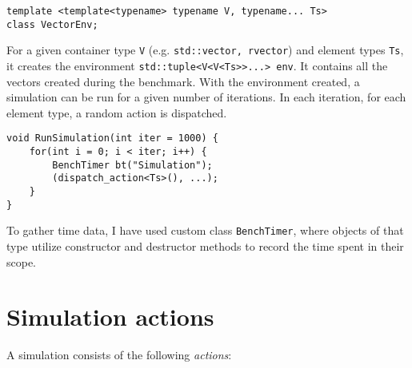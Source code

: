 \documentclass[inz, english, shortabstract]{iithesis}
\begin{document}
\begin{lstlisting}[caption=VectorEnv declaration]
template <template<typename> typename V, typename... Ts>
class VectorEnv;
\end{lstlisting}
For a given container type {\tt V} (e.g. {\tt std::vector, rvector}) and element types {\tt Ts}, it creates 
the environment {\tt std::tuple<V<V<Ts>>...> env}.
It contains all the vectors created during the benchmark.
With the environment created, a simulation can be run for a given number of iterations.
In each iteration, for each element type, a random action is dispatched.

\begin{lstlisting}[caption=RunSimulation]
void RunSimulation(int iter = 1000) {
	for(int i = 0; i < iter; i++) {
		BenchTimer bt("Simulation");
		(dispatch_action<Ts>(), ...);
	}
}
\end{lstlisting}

To gather time data, I have used custom class {\tt BenchTimer}, where objects of that type utilize constructor and destructor methods to record the time spent in their scope.

\clearpage

\section{Simulation actions}

A simulation consists of the following \emph{actions}:
\end{document}
